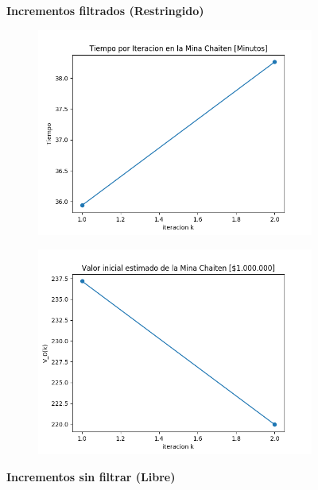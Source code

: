 \documentclass[12pt,letterpaper]{article}
\begin{document}
\begin{figure}[H]
  \textbf{Incrementos filtrados (Restringido)}
  
  \begin{subfigure}[b]{0.4\textwidth}
     \includegraphics[width=\textwidth]{Graficos/Incrementos_filtrados/restringido/chaiten_inc_times.png}
     \caption{}
     \label{fig:ex1}
  \end{subfigure}
  \begin{subfigure}[b]{0.4\textwidth}
     \includegraphics[width=\textwidth]{Graficos/Incrementos_filtrados/restringido/chaiten_inc_v_k.png}
     \caption{}
     \label{fig:ex2}
  \end{subfigure}

  \textbf{Incrementos sin filtrar (Libre)}
  

\end{figure}
\end{document}
